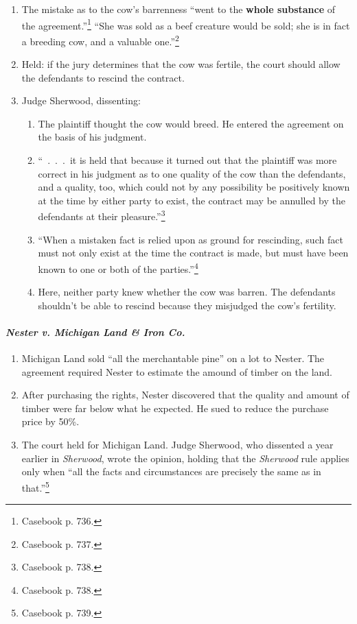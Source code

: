 \begin{enumerate}
{    point}, even though a material point, an error as to which does not affect 
    the substance of the whole consideration.''\footnote{Casebook p. 736.}
    \item The mistake as to the cow's barrenness ``went to the \textbf{whole 
    substance} of the agreement.''\footnote{Casebook p. 736.} ``She was sold 
    as a beef creature would be sold; she is in fact a breeding cow, and a 
    valuable one.''\footnote{Casebook p. 737.}
    \item Held: if the jury determines that the cow was fertile, the court 
    should allow the defendants to rescind the contract.
    \item Judge Sherwood, dissenting:
    \begin{enumerate}
        \item The plaintiff thought the cow would breed. He entered the 
        agreement on the basis of his judgment. 
        \item ``~.~.~.~it is held that because it turned out that the 
        plaintiff was more correct in his judgment as to one quality of the 
        cow than the defendants, and a quality, too, which could not by any 
        possibility be positively known at the time by either party to exist, 
        the contract may be annulled by the defendants at their 
        pleasure.''\footnote{Casebook p. 738.}
        \item ``When a mistaken fact is relied upon as ground for rescinding, 
        such fact must not only exist at the time the contract is made, but 
        must have been known to one or both of the 
        parties.''\footnote{Casebook p. 738.}
        \item Here, neither party knew whether the cow was barren. The 
        defendants shouldn't be able to rescind because they misjudged the 
        cow's fertility.
    \end{enumerate}
\end{enumerate}

\paragraph{\emph{Nester v. Michigan Land \& Iron Co.}}

\begin{enumerate}
    \item Michigan Land sold ``all the merchantable pine'' on a lot to Nester. 
    The agreement required Nester to estimate the amound of timber on the 
    land.
    \item After purchasing the rights, Nester discovered that the quality and 
    amount of timber were far below what he expected. He sued to reduce the 
    purchase price by 50\%.
    \item The court held for Michigan Land. Judge Sherwood, who dissented a 
    year earlier in \emph{Sherwood}, wrote the opinion, holding that the 
    \emph{Sherwood} rule applies only when ``all the facts and circumstances 
    are precisely the same as in that.''\footnote{Casebook p. 739.}
\end{enumerate}

